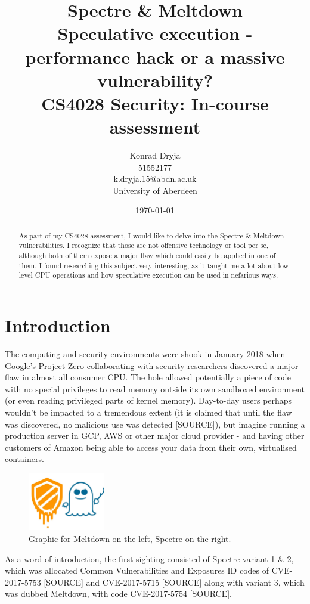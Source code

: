 \documentclass{article}
\title{Spectre \& Meltdown \\
\large{Speculative execution - performance hack or a massive vulnerability? \\ CS4028 Security: In-course assessment}}
\author{Konrad Dryja \\ 51552177 \\ k.dryja.15@abdn.ac.uk \\ University of Aberdeen}
\date{\today}
\begin{document}
 
\maketitle
 
\tableofcontents

\begin{abstract}
  As part of my CS4028 assessment, I would like to delve into the Spectre \& Meltdown vulnerabilities. I recognize that those are not offensive technology or tool per se, although both of them expose a major flaw which could easily be applied in one of them. I found researching this subject very interesting, as it taught me a lot about low-level CPU operations and how speculative execution can be used in nefarious ways. 
\end{abstract}
 
\section{Introduction}
 
The computing and security environments were shook in January 2018 when Google's Project Zero collaborating with security researchers discovered a major flaw in almost all consumer CPU. The hole allowed potentially a piece of code with no special privileges to read memory outside its own sandboxed environment (or even reading privileged parts of kernel memory). Day-to-day users perhaps wouldn't be impacted to a tremendous extent (it is claimed that until the flaw was discovered, no malicious use was detected [SOURCE]), but imagine running a production server in GCP, AWS or other major cloud provider - and having other customers of Amazon being able to access your data from their own, virtualised containers. 

\begin{figure}[h]
\centering
\includegraphics[width=0.3\textwidth]{logo}
  \caption{Graphic for Meltdown on the left, Spectre on the right.}
\end{figure}

As a word of introduction, the first sighting consisted of Spectre variant 1 \& 2, which was allocated Common Vulnerabilities and Exposures ID codes of CVE-2017-5753 [SOURCE] and CVE-2017-5715 [SOURCE] along with variant 3, which was dubbed Meltdown, with code CVE-2017-5754 [SOURCE].
 
\end{document}
